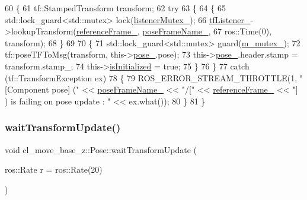 \begin{DoxyCode}
60     \{
61         tf::StampedTransform transform;
62         \textcolor{keywordflow}{try}
63         \{
64             \{
65                 std::lock\_guard<std::mutex> lock(\hyperlink{classcl__move__base__z_1_1Pose_ae1b5ee53f49d74926e04a477d792f1d0}{listenerMutex\_});
66                 \hyperlink{classcl__move__base__z_1_1Pose_a188a5ac62d5424c1eacd667868049962}{tfListener\_}->lookupTransform(\hyperlink{classcl__move__base__z_1_1Pose_a6a7a593232b6edaf99103d48ad8da9d3}{referenceFrame\_}, 
      \hyperlink{classcl__move__base__z_1_1Pose_a4f45be8e2fd73e618d815582a4ca8efe}{poseFrameName\_},
67                                                   ros::Time(0), transform);
68             \}
69 
70             \{
71                 std::lock\_guard<std::mutex> guard(\hyperlink{classcl__move__base__z_1_1Pose_a73ed2daba3e473e156cab751fb37b58f}{m\_mutex\_});
72                 tf::poseTFToMsg(transform, this->\hyperlink{classcl__move__base__z_1_1Pose_a9da7acf880968a3c220b8436fd0bb6ef}{pose\_}.pose);
73                 this->\hyperlink{classcl__move__base__z_1_1Pose_a9da7acf880968a3c220b8436fd0bb6ef}{pose\_}.header.stamp = transform.stamp\_;
74                 this->\hyperlink{classcl__move__base__z_1_1Pose_a49df3a978021edb71a48ef5e6d8e75a8}{isInitialized} = \textcolor{keyword}{true};
75             \}
76         \}
77         \textcolor{keywordflow}{catch} (tf::TransformException ex)
78         \{
79             ROS\_ERROR\_STREAM\_THROTTLE(1, \textcolor{stringliteral}{"[Component pose] ("} << \hyperlink{classcl__move__base__z_1_1Pose_a4f45be8e2fd73e618d815582a4ca8efe}{poseFrameName\_} << \textcolor{stringliteral}{"/["} << 
      \hyperlink{classcl__move__base__z_1_1Pose_a6a7a593232b6edaf99103d48ad8da9d3}{referenceFrame\_} << \textcolor{stringliteral}{"] ) is failing on pose update : "} << ex.what());
80         \}
81     \}
\end{DoxyCode}
\mbox{\label{classcl__move__base__z_1_1Pose_a5f8576c3dacfb2f2e7f9df5105c480ea}} 
\subsubsection{\texorpdfstring{wait\+Transform\+Update()}{waitTransformUpdate()}}
{\footnotesize\ttfamily void cl\+\_\+move\+\_\+base\+\_\+z\+::\+Pose\+::wait\+Transform\+Update (\begin{DoxyParamCaption}\item[{ros\+::\+Rate}]{r = {\ttfamily ros\+:\+:Rate(20)} }\end{DoxyParamCaption})}



